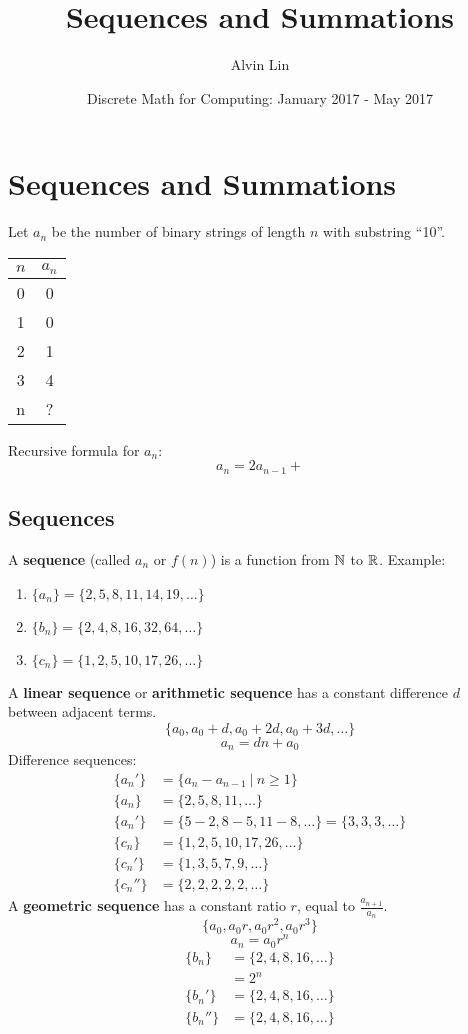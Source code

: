 \documentclass[letterpaper, 12pt]{math}
\title{Sequences and Summations}
\author{Alvin Lin}
\date{Discrete Math for Computing: January 2017 - May 2017}
\begin{document}
\maketitle

\section*{Sequences and Summations}
Let \( a_{n} \) be the number of binary strings of length \( n \) with substring
``10''.
\begin{center}
  \begin{tabular}{|c|c|}
    \hline
    \( n \) & \( a_{n} \) \\
    \hline
    0 & 0 \\
    \hline
    1 & 0 \\
    \hline
    2 & 1 \\
    \hline
    3 & 4 \\
    \hline
    n & ? \\
    \hline
  \end{tabular}
\end{center}
Recursive formula for \( a_{n} \):
\[ a_{n} = 2a_{n-1}+ \]

\subsection*{Sequences}
A \textbf{sequence} (called \( a_{n} \) or \( f(n) \)) is a function from
\( \mathbb{N} \) to \( \mathbb{R} \). Example:
\begin{enumerate}
  \item \( \{a_{n}\} = \{2,5,8,11,14,19,\dots\} \)
  \item \( \{b_{n}\} = \{2,4,8,16,32,64,\dots\} \)
  \item \( \{c_{n}\} = \{1,2,5,10,17,26,\dots\} \)
\end{enumerate}
A \textbf{linear sequence} or \textbf{arithmetic sequence} has a constant
difference \( d \) between adjacent terms.
\[ \{a_{0},a_{0}+d,a_{0}+2d,a_{0}+3d,\dots\} \]
\[ a_{n} = dn+a_{0} \]
Difference sequences:
\begin{align*}
  \{a_{n}'\} &= \{a_{n}-a_{n-1}\ |\ n \geq 1\} \\
  \{a_{n}\} &= \{2,5,8,11,\dots\} \\
  \{a_{n}'\} &= \{5-2,8-5,11-8,\dots\} = \{3,3,3,\dots\} \\
  \{c_{n}\} &= \{1,2,5,10,17,26,\dots\} \\
  \{c_{n}'\} &= \{1,3,5,7,9,\dots\} \\
  \{c_{n}''\} &= \{2,2,2,2,2,\dots\}
\end{align*}
A \textbf{geometric sequence} has a constant ratio \( r \), equal to
\( \frac{a_{n+1}}{a_{n}} \).
\[ \{a_{0},a_{0}r,a_{0}r^{2},a_{0}r^{3}\} \]
\[ a_{n} = a_{0}r^{n} \]
\begin{align*}
  \{b_{n}\} &= \{2,4,8,16,\dots\} \\
  &= 2^{n} \\
  \{b_{n}'\} &= \{2,4,8,16,\dots\} \\
  \{b_{n}''\} &= \{2,4,8,16,\dots\}
\end{align*}
\end{document}

